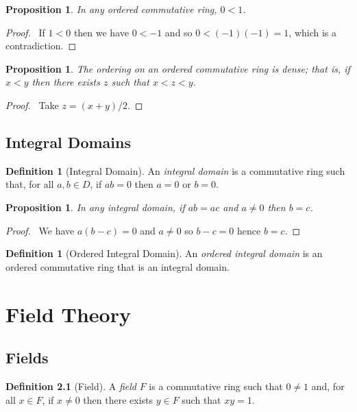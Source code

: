 \documentclass{book}
\let\qed\relax
\newtheorem{prop}[ax]{Proposition}
\theoremstyle{definition}
\newtheorem{df}[ax]{Definition}
\begin{document}
\begin{prop}
In any ordered commutative ring, $0 < 1$.
\end{prop}

\begin{proof}
\pf\ If $1 < 0$ then we have $0 < -1$ and so $0 < (-1)(-1) = 1$, which is a contradiction. \qed
\end{proof}

\begin{prop}
The ordering on an ordered commutative ring is dense; that is, if $x < y$ then there exists $z$ such that $x < z < y$.
\end{prop}

\begin{proof}
\pf\ Take $z = (x + y) / 2$. \qed
\end{proof}

\section{Integral Domains}

\begin{df}[Integral Domain]
An \emph{integral domain} is a commutative ring such that, for all $a,b \in D$, if $ab = 0$ then $a = 0$ or $b = 0$.
\end{df}

\begin{prop}
\label{prop:multcancel}
In any integral domain, if $ab = ac$ and $a \neq 0$ then $b = c$.
\end{prop}

\begin{proof}
\pf\ We have $a(b-c) = 0$ and $a \neq 0$ so $b - c = 0$ hence $b = c$. \qed
\end{proof}

\begin{df}[Ordered Integral Domain]
An \emph{ordered integral domain} is an ordered commutative ring that is an integral domain.
\end{df}

\chapter{Field Theory}

\section{Fields}

\begin{df}[Field]
A \emph{field} $F$ is a commutative ring such that $0 \neq 1$ and, for all $x \in F$, if $x \neq 0$ then there exists $y \in F$ such that $xy = 1$.
\end{df}
\end{document}
